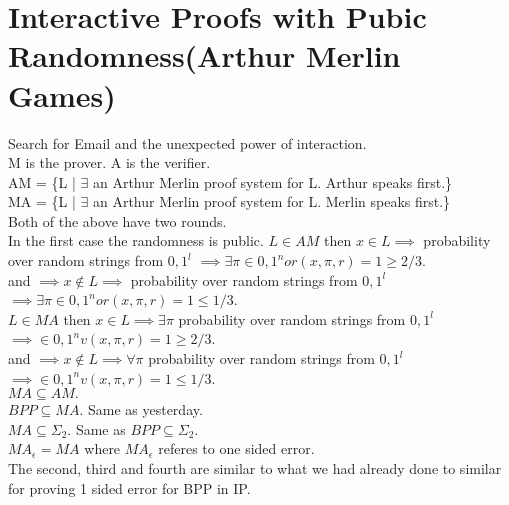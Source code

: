 \documentclass[solution,addpoints,12pt]{exam}
\begin{document}
\section{Interactive Proofs with Pubic Randomness(Arthur Merlin Games)}
Search for Email and the unexpected power of interaction.\\
M is the prover. A is the verifier. \\
AM = \{L | $\exists$ an Arthur Merlin proof system for L. Arthur speaks first.\}\\
MA = \{L | $\exists$ an Arthur Merlin proof system for L. Merlin speaks first.\}\\
Both of the above have two rounds.\\
In the first case the randomness is public.
$L \in AM$ then $x \in L \implies$ probability over random strings
from ${0, 1}^l$ $\implies \exists \pi \in {0, 1}^n or (x, \pi, r) = 1 \ge 2/3$.\\
and $\implies x \not \in L \implies$ probability over random strings
from ${0, 1}^l$ $\implies \exists \pi \in {0, 1}^n or (x, \pi, r) = 1 \le 1/3$.\\
$L \in MA$ then $x \in L \implies \exists \pi$ probability over random strings
from ${0, 1}^l$ $\implies \in {0, 1}^n v(x, \pi, r) = 1 \ge 2/3$.\\
and $\implies x \not \in L \implies \forall \pi$ probability over random strings
from ${0, 1}^l$ $\implies \in {0, 1}^n v(x, \pi, r) = 1 \le 1/3$.\\

$MA \subseteq AM.$\\
$BPP \subseteq MA.$ Same as yesterday.\\
$MA \subseteq \Sigma_2.$ Same as $BPP \subseteq \Sigma_2.$\\
$MA_\epsilon = MA$ where $MA_\epsilon$ referes to one sided error.\\
The second, third and fourth are similar to what we had already done to
similar for proving 1 sided error for BPP in IP.\\
\end{document}
